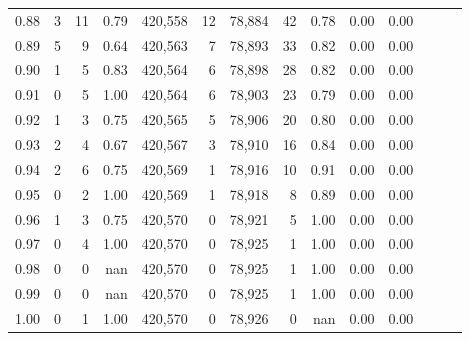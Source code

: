 \begin{tabular}{rrrrrrrrrrrrrr}
0.88 &       3 &     11 &  0.79 &  420,558 &       12 &  78,884 &      42 &  0.78 &  0.00 &      0.00 \\
0.89 &       5 &      9 &  0.64 &  420,563 &        7 &  78,893 &      33 &  0.82 &  0.00 &      0.00 \\
0.90 &       1 &      5 &  0.83 &  420,564 &        6 &  78,898 &      28 &  0.82 &  0.00 &      0.00 \\
0.91 &       0 &      5 &  1.00 &  420,564 &        6 &  78,903 &      23 &  0.79 &  0.00 &      0.00 \\
0.92 &       1 &      3 &  0.75 &  420,565 &        5 &  78,906 &      20 &  0.80 &  0.00 &      0.00 \\
0.93 &       2 &      4 &  0.67 &  420,567 &        3 &  78,910 &      16 &  0.84 &  0.00 &      0.00 \\
0.94 &       2 &      6 &  0.75 &  420,569 &        1 &  78,916 &      10 &  0.91 &  0.00 &      0.00 \\
0.95 &       0 &      2 &  1.00 &  420,569 &        1 &  78,918 &       8 &  0.89 &  0.00 &      0.00 \\
0.96 &       1 &      3 &  0.75 &  420,570 &        0 &  78,921 &       5 &  1.00 &  0.00 &      0.00 \\
0.97 &       0 &      4 &  1.00 &  420,570 &        0 &  78,925 &       1 &  1.00 &  0.00 &      0.00 \\
0.98 &       0 &      0 &   nan &  420,570 &        0 &  78,925 &       1 &  1.00 &  0.00 &      0.00 \\
0.99 &       0 &      0 &   nan &  420,570 &        0 &  78,925 &       1 &  1.00 &  0.00 &      0.00 \\
1.00 &       0 &      1 &  1.00 &  420,570 &        0 &  78,926 &       0 &   nan &  0.00 &      0.00 \\
\bottomrule
\end{tabular}
